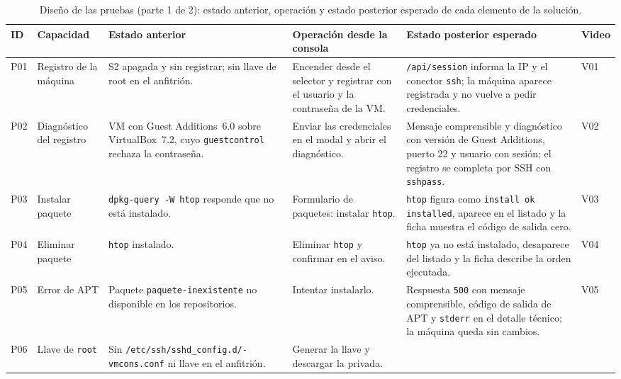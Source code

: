 \begin{table}[!tp]
  \centering
  \caption{Diseño de las pruebas (parte 1 de 2): estado anterior,
  operación y estado posterior esperado de cada elemento de la solución.}
  \label{tab:diseno-pruebas}
  \scriptsize
  \begin{tabularx}{\textwidth}{@{}l >{\raggedright\arraybackslash}p{2.3cm}
      >{\raggedright\arraybackslash}X >{\raggedright\arraybackslash}X
      >{\raggedright\arraybackslash}X
      >{\raggedright\arraybackslash}p{1.0cm}@{}}
    \hline
    ID & Capacidad & Estado anterior & Operación desde la consola &
    Estado posterior esperado & Video \\
    \hline
    P01 & Registro de la máquina & S2 apagada y sin registrar; sin
    llave de root en el anfitrión. & Encender desde el selector y
    registrar con el usuario y la contraseña de la VM. &
    \texttt{/api/session} informa la IP y el conector \texttt{ssh}; la
    máquina aparece registrada y no vuelve a pedir credenciales. & V01 \\
    P02 & Diagnóstico del registro & VM con Guest Additions~6.0 sobre
    VirtualBox~7.2, cuyo \texttt{guestcontrol} rechaza la contraseña. &
    Enviar las credenciales en el modal y abrir el diagnóstico. &
    Mensaje comprensible y diagnóstico con versión de Guest Additions,
    puerto 22 y usuario con sesión; el registro se completa por SSH con
    \texttt{sshpass}. & V02 \\
    P03 & Instalar paquete & \texttt{dpkg-query -W htop} responde que no
    está instalado. & Formulario de paquetes: instalar \texttt{htop}. &
    \texttt{htop} figura como \texttt{install ok installed}, aparece en
    el listado y la ficha muestra el código de salida cero. & V03 \\
    P04 & Eliminar paquete & \texttt{htop} instalado. & Eliminar
    \texttt{htop} y confirmar en el aviso. & \texttt{htop} ya no está
    instalado, desaparece del listado y la ficha describe la orden
    ejecutada. & V04 \\
    P05 & Error de APT & Paquete \texttt{paquete-inexistente} no
    disponible en los repositorios. & Intentar instalarlo. & Respuesta
    \texttt{500} con mensaje comprensible, código de salida de APT y
    \texttt{stderr} en el detalle técnico; la máquina queda sin cambios.
    & V05 \\
    P06 & Llave de \texttt{root} & Sin
    \texttt{/etc/ssh/\allowbreak sshd\_config.d/\allowbreak
    99-vmcons.conf} ni llave en el
    anfitrión. & Generar la llave y descargar la privada. &

\end{tabularx}
\end{table}
